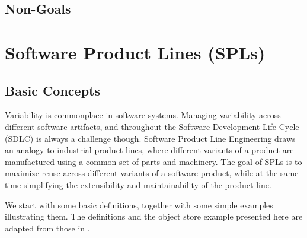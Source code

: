 \documentclass[11pt]{article}
\begin{document}
\subsection{Non-Goals} 
%
%
%
%
%
%
\section{Software Product Lines (SPLs)}

\subsection{Basic Concepts}

Variability is commonplace in software systems. Managing variability across different software artifacts, and throughout the Software Development Life Cycle (SDLC) is always a challenge though. Software Product Line Engineering draws an analogy to industrial product lines, where different variants of a product are manufactured using a common set of parts and machinery. The goal of SPLs is to maximize reuse across different variants of a software product, while at the same time simplifying the extensibility and maintainability of the product line.

We start with some basic definitions, together with some simple examples illustrating them. The definitions and the object store example presented here are adapted from those in \cite{Thum}.
\end{document}
